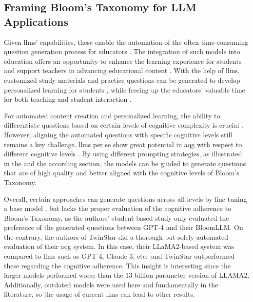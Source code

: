 \vspace{8em}\pagebreak

\subsection{Framing Bloom's Taxonomy for LLM Applications} \label{sec:blooms-taxonomy}

Given \ac{llms}' capabilities, these enable the automation of the often time-consuming question generation process for educators \cite{vu_chatgpt-based_2024}. The integration of such models into education offers an opportunity to enhance the learning experience for students and support teachers in advancing educational content \cite{naveed_comprehensive_2024}. 
With the help of \ac{llms}, customized study materials and practice questions can be generated to develop personalized learning for students \cite{al_faraby_analysis_2024,bhowmick_automating_2023,hang_mcqgen_2024}, while freeing up the educators' valuable time for both teaching and student interaction \cite{naveed_comprehensive_2024}.

 For automated content creation and personalized learning, the ability to differentiate questions based on certain levels of cognitive complexity is crucial \cite{li_planning_2024,zhuge_twinstar_2025}. However, aligning the automated questions with specific cognitive levels still remains a key challenge. \ac{llms} per se show great potential in \ac{aqg} with respect to different cognitive levels \cite{maity_can_2025,blobstein_angel_2023,duong-trung_bloomllm_2024,scaria_automated_2024,scaria_how_2024}. 
By using different prompting strategies, as illustrated in the  and the according  section, the models can be guided to generate questions that are of high quality and better aligned with the cognitive levels of Bloom's Taxonomy. 

Overall, certain approaches can generate questions across all levels by fine-tuning a base model \cite{duong-trung_bloomllm_2024,zhuge_twinstar_2025}, but \cite{duong-trung_bloomllm_2024} lacks the proper evaluation of the cognitive adherence to Bloom's Taxonomy, as the authors' student-based study only evaluated the preference of the generated questions between GPT-4 and their BloomLLM. On the contrary, the authors of TwinStar \cite{zhuge_twinstar_2025} did a thorough but solely automated evaluation of their \ac{aqg} system. In this case, their LLaMA2-based system was compared to \ac{llms} such as GPT-4, Claude 3, etc.\ and TwinStar outperformed these regarding the cognitive adherence. This insight is interesting since the larger models performed worse than the 13 billion parameter version of LLAMA2. Additionally, outdated models were used here and fundamentally in the literature, so the usage of current \ac{llms} can lead to other results. 

